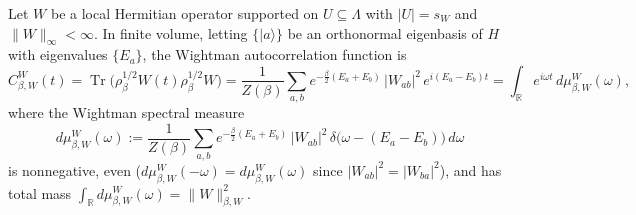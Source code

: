 \documentclass[11pt,a4paper]{article}
\numberwithin{equation}{section}
\theoremstyle{plain}
\theoremstyle{definition}
\newcommand{\Tr}{\operatorname{Tr}}
\begin{document}
Let $W$ be a local Hermitian operator supported on $U\subseteq\Lambda$ with $|U|=s_W$ and $\|W\|_\infty < \infty$. In finite volume, letting $\{|a\rangle\}$ be an orthonormal eigenbasis of $H$ with eigenvalues $\{E_a\}$, the Wightman autocorrelation function is
\begin{equation}\label{eq:CbetaW-eigen}
  C_{\beta,W}^W(t) = \Tr\!\bigl(\rho_\beta^{1/2}W(t)\rho_\beta^{1/2}W\bigr)
  = \frac{1}{Z(\beta)}\sum_{a,b} e^{-\frac{\beta}{2}(E_a+E_b)}\,|W_{ab}|^2\,e^{i(E_a-E_b)t}
  = \int_{\mathbb{R}} e^{i\omega t}\,d\mu_{\beta,W}^W(\omega),
\end{equation}
where the Wightman spectral measure
\[
  d\mu_{\beta,W}^W(\omega) := \frac{1}{Z(\beta)}\sum_{a,b} e^{-\frac{\beta}{2}(E_a+E_b)}\,|W_{ab}|^2\,\delta\bigl(\omega-(E_a-E_b)\bigr)\,d\omega
\]
is nonnegative, even ($d\mu_{\beta,W}^W(-\omega) = d\mu_{\beta,W}^W(\omega)$ since $|W_{ab}|^2 = |W_{ba}|^2$), and has total mass $\int_{\mathbb{R}} d\mu_{\beta,W}^W(\omega) = \|W\|_{\beta,W}^2$.
\end{document}
